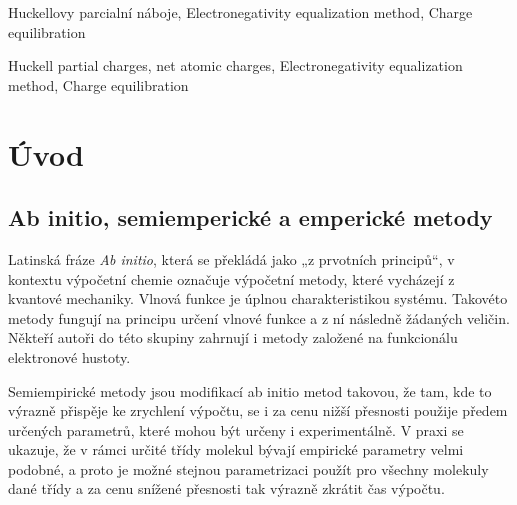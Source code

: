 \documentclass[11pt,draft,oneside]{fithesis2}
\begin{document}
\begin{ThesisKeyWords}
Huckellovy parcialní náboje, Electronegativity equalization method, Charge equilibration

Huckell partial charges, net atomic charges, Electronegativity equalization method, Charge equilibration
\end{ThesisKeyWords}

\MainMatter

\tableofcontents

\chapter*{Úvod}


\section{Ab initio, semiemperické a emperické metody}

Latinská fráze \emph{Ab initio}, která se překládá jako „z prvotních principů“, v kontextu výpočetní chemie označuje výpočetní metody, které vycházejí z kvantové mechaniky. Vlnová funkce je úplnou charakteristikou systému. Takovéto metody fungují na principu určení vlnové funkce a z ní následně žádaných veličin. Někteří autoři do této skupiny zahrnují i metody založené na funkcionálu elektronové hustoty.

Semiempirické metody jsou modifikací ab initio metod takovou, že tam, kde to výrazně přispěje ke zrychlení výpočtu, se i za cenu nižší přesnosti použije předem určených parametrů, které mohou být určeny i experimentálně. V praxi se ukazuje, že v rámci určité třídy molekul bývají empirické parametry velmi podobné, a proto je možné stejnou parametrizaci použít pro všechny molekuly dané třídy a za cenu snížené přesnosti tak výrazně zkrátit čas výpočtu.
\end{document}
